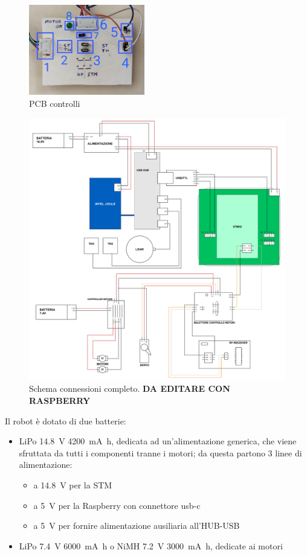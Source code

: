 \begin{figure}[] 
	\centering
	\includegraphics[width=0.45\textwidth]{pcb_controlli.png}
	\caption{PCB controlli}
	\label{fig:pcb_controlli}
\end{figure}

\begin{figure}[] 
	\centering    
	\includegraphics[width=1\textwidth]{schema_completo.pdf}
	\caption{Schema connessioni completo. \textbf{DA EDITARE CON RASPBERRY}}
	\label{fig:schema_completo}
\end{figure}

Il robot è dotato di due batterie:
\begin{itemize}
	\item LiPo \SI{14.8}{\volt} \SI{4200}{\milli \ampere \hour}, dedicata ad un’alimentazione generica, che viene sfruttata da tutti i componenti tranne i motori; da questa partono 3 linee di alimentazione: 
	\begin{itemize}
		\item a \SI{14.8}{\volt} per la STM
		\item a \SI{5}{\volt} per la Raspberry con connettore usb-c
		\item a \SI{5}{\volt} per fornire alimentazione ausiliaria all’HUB-USB
	\end{itemize}
	\item LiPo \SI{7.4}{\volt} \SI{6000}{\milli \ampere \hour} o NiMH \SI{7.2}{\volt} \SI{3000}{\milli \ampere \hour}, dedicate ai motori
\end{itemize}

